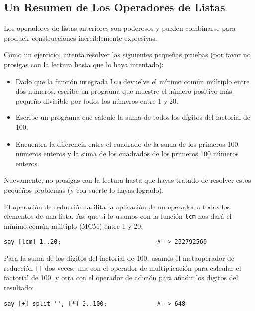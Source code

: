 \subsection{Un Resumen de Los Operadores de Listas}

Los operadores de listas anteriores son poderosos y pueden 
combinarse para producir construcciones increíblemente expresivas.

Como un ejercicio, intenta resolver las siguientes pequeñas pruebas 
(por favor no prosigas con la lectura hasta que lo haya intentado):

\begin{itemize}
\item Dado que la función integrada {\tt lcm} devuelve el mínimo
común múltiplo entre dos números, escribe un programa que muestre
el número positivo más pequeño divisible por todos los números
entre 1 y 20.

\item Escribe un programa que calcule la suma de todos los dígitos del factorial
de 100.

\item Encuentra la diferencia entre el cuadrado de la suma de los
primeros 100 números enteros y la suma de los cuadrados de los
primeros 100 números enteros.
\end{itemize}

Nuevamente, no prosigas con la lectura hasta que hayas 
tratado de resolver estos pequeños problemas (y con suerte
lo hayas logrado).

El operación de reducción facilita la aplicación de un 
operador a todos los elementos de una lista. Así que si lo
usamos con la función {\tt lcm} nos dará el mínimo común 
múltiplo (MCM) entre 1 y 20:

\begin{verbatim}
say [lcm] 1..20;                           # -> 232792560
\end{verbatim}

Para la suma de los dígitos del factorial de 100, usamos 
el metaoperador de reducción \verb|[]| dos veces, una con el
operador de multiplicación para calcular el factorial de 100,
y otra con el operador de adición para añadir los dígitos del 
resultado:

\begin{verbatim}
say [+] split '', [*] 2..100;              # -> 648
\end{verbatim}

